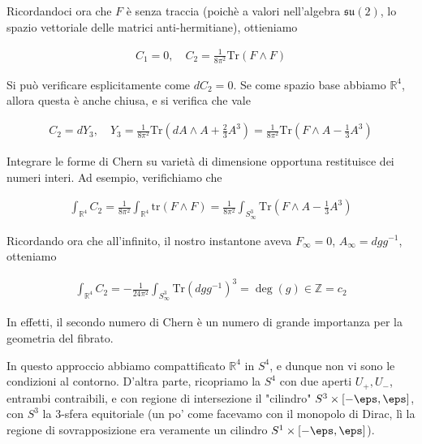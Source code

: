 \documentclass{report}
\begin{document}
Ricordandoci ora che \(F\) è senza traccia (poichè a valori nell'algebra \(\mathfrak{su}(2)\), lo spazio vettoriale delle matrici anti-hermitiane), ottieniamo

\begin{align}
    C_1 = 0, \quad C_2 = \frac{1}{8\pi^2}\text{Tr}(F \wedge F)
\end{align}

Si può verificare esplicitamente come \(dC_2 =0\). Se come spazio base abbiamo \(\mathbb{R}^4\), allora questa è anche chiusa, e si verifica che vale 

\begin{align}
    C_2 = dY_3, \quad Y_3 = \frac{1}{8\pi^2}\text{Tr}\left(dA \wedge A + \frac{2}{3}A^3 \right) = \frac{1}{8\pi^2}\text{Tr}\left(F \wedge A - \frac{1}{3}A^3 \right)
\end{align}

Integrare le forme di Chern su varietà di dimensione opportuna restituisce dei numeri interi. Ad esempio, verifichiamo che 

\begin{align}
    \int_{\mathbb{R}^4} C_2 = \frac{1}{8\pi^2}\int_{\mathbb{R}^4}\text{tr}(F\wedge F) = \frac{1}{8\pi^2}\int_{S^3_{\infty}} \text{Tr}\left(F \wedge A - \frac{1}{3}A^3\right)
\end{align}

Ricordando ora che all'infinito, il nostro instantone aveva \(F_{\infty} = 0\), \(A_{\infty} = dg g^{-1}\), otteniamo 

\begin{align}
    \int_{\mathbb{R}^4} C_2 = -\frac{1}{24\pi^2}\int_{S^3_{\infty}}\text{Tr}(dg g^{-1})^3 = \deg(g) \in \mathbb{Z} = c_2
\end{align}

In effetti, il secondo numero di Chern è un numero di grande importanza per la geometria del fibrato. 


In questo approccio abbiamo compattificato \(\mathbb{R}^4\) in \(S^4\), e dunque non vi sono le condizioni al contorno. D'altra parte, ricopriamo la \(S^4\) con due aperti \(U_+, U_-\), entrambi contraibili, e con regione di intersezione il "cilindro" \(S^3 \times [-\eps, \eps]\), con \(S^3\) la 3-sfera equitoriale (un po' come facevamo con il monopolo di Dirac, lì la regione di sovrapposizione era veramente un cilindro \(S^1 \times [-\eps, \eps]\)). 
\end{document}
